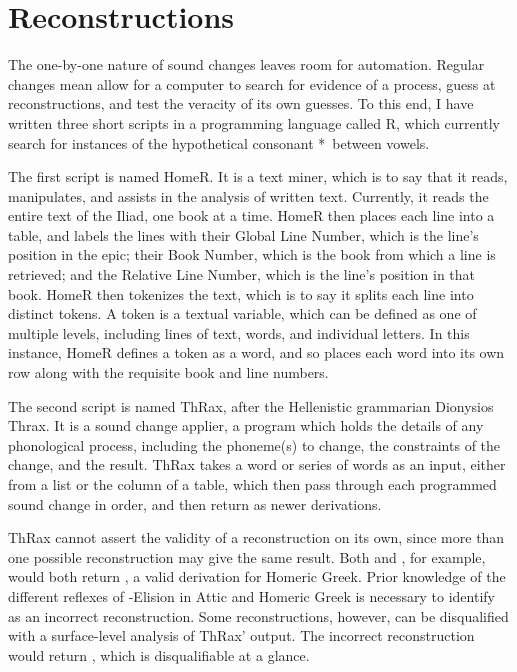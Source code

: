 \section{Reconstructions}\label{sec:Recon}
The one-by-one nature of sound changes leaves room for automation. Regular changes mean allow for a computer to search for evidence of a process, guess at reconstructions, and test the veracity of its own guesses.  To this end, I have written three short scripts in a programming language called R, which currently search for instances of the hypothetical consonant *\w\ between vowels.

The first script is named HomeR. It is a text miner, which is to say that it reads, manipulates, and assists in the analysis of written text. Currently, it reads the entire text of the Iliad, one book at a time. HomeR then places each line into a table, and labels the lines with their Global Line Number, which is the line's position in the epic; their Book Number, which is the book from which a line is retrieved; and the Relative Line Number, which is the line's position in that book. HomeR then tokenizes the text, which is to say it splits each line into distinct tokens. A token is a textual variable, which can be defined as one of multiple levels, including lines of text, words, and individual letters. In this instance, HomeR defines a token as a word, and so places each word into its own row along with the requisite book and line numbers.



The second script is named ThRax, after the Hellenistic grammarian Dionysios Thrax. It is a sound change applier, a program which holds the details of any phonological process, including the phoneme(s) to change, the constraints of the change, and the result. ThRax takes a word or series of words as an input, either from a list or the column of a table, which then pass through each programmed sound change in order, and then return as newer derivations. 

ThRax cannot assert the validity of a reconstruction on its own, since more than one possible reconstruction may give the same result. Both  and , for example, would both return , a valid derivation for Homeric Greek. Prior knowledge of the different reflexes of \W-Elision in Attic and Homeric Greek is necessary to identify  as an incorrect reconstruction. Some reconstructions, however, can be disqualified with a surface-level analysis of ThRax' output. The incorrect reconstruction  would return , which is disqualifiable at a glance.

